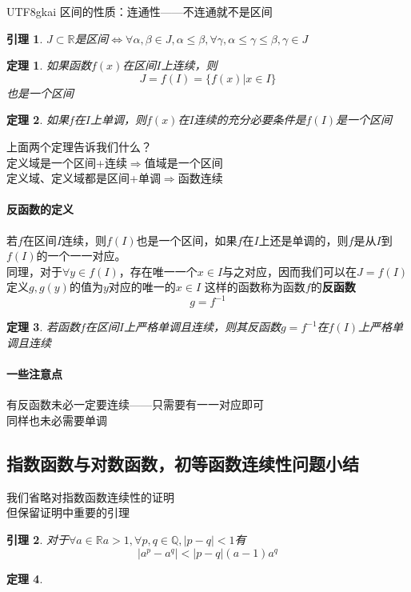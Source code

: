 \documentclass{article}
\newtheorem{theorem}{定理}[subsection]
\newtheorem{lemma}{引理}[subsection]
\begin{document}
\begin{CJK}{UTF8}{gkai}
区间的性质：连通性——不连通就不是区间\\
\begin{lemma}
$J\subset\mathbb{R}$是区间$\Leftrightarrow\forall \alpha,\beta\in J,\alpha\leq \beta,\forall\gamma ,\alpha\leq\gamma\leq\beta,\gamma\in J$
\end{lemma}
\begin{theorem}
如果函数$f(x)$在区间$I$上连续，则
\[J=f(I)=\{f(x)|x\in I\}\]
也是一个区间\\
\end{theorem}
\begin{theorem}
如果$f$在$I$上单调，则$f(x)$在$I$连续的充分必要条件是$f(I)$是一个区间\\
\end{theorem}
上面两个定理告诉我们什么？\\
定义域是一个区间+连续$\Rightarrow$值域是一个区间\\
定义域、定义域都是区间+单调$\Rightarrow$函数连续\\

\paragraph{反函数的定义\\}
若$f$在区间$I$连续，则$f(I)$也是一个区间，如果$f$在$I$上还是单调的，则$f$是从$I$到$f(I)$的一个一一对应。\\
同理，对于$\forall y\in f(I)$，存在唯一一个$x\in I$与之对应，因而我们可以在$J=f(I)$定义$g,g(y)$的值为$y$对应的唯一的$x\in I$
这样的函数称为函数$f$的\textbf{反函数}
\[g=f^{-1}\]
\begin{theorem}

若函数$f$在区间$I$上严格单调且连续，则其反函数$g=f^{-1}$在$f(I)$上严格单调且连续\\
\end{theorem}

\paragraph{一些注意点\\}
有反函数未必一定要连续——只需要有一一对应即可\\
同样也未必需要单调\\
\subsection{指数函数与对数函数，初等函数连续性问题小结}

我们省略对指数函数连续性的证明\\
但保留证明中重要的引理\\
\begin{lemma}
对于$\forall a\in \mathbb{R} a>1,\forall p,q\in \mathbb{Q}, |p-q| < 1$有
\[|a^p-a^q|<|p-q|(a-1)a^q\]
\end{lemma}
\begin{theorem}


\end{theorem}
\end{CJK}
\end{document}
